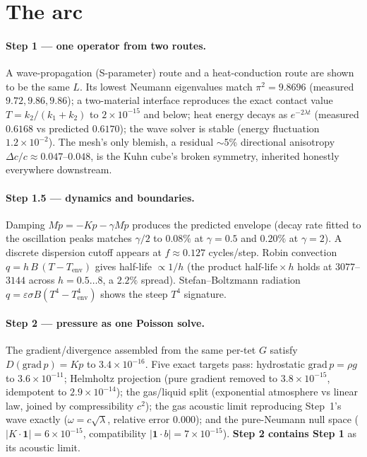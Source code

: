 \documentclass[11pt]{article}
\begin{document}
\section{The arc}

\paragraph{Step 1 --- one operator from two routes.}
A wave-propagation (S-parameter) route and a heat-conduction route are shown to be
the same $L$. Its lowest Neumann eigenvalues match $\pi^2 = 9.8696$ (measured
$9.72, 9.86, 9.86$); a two-material interface reproduces the exact contact value
$T = k_2/(k_1+k_2)$ to $2\times10^{-15}$ and below; heat energy decays as
$e^{-2\lambda t}$ (measured $0.6168$ vs predicted $0.6170$); the wave solver is
stable (energy fluctuation $1.2\times10^{-2}$). The mesh's only blemish, a residual
$\sim$5\% directional anisotropy $\Delta c/c \approx 0.047$--$0.048$, is the Kuhn
cube's broken symmetry, inherited honestly everywhere downstream.

\paragraph{Step 1.5 --- dynamics and boundaries.}
Damping $M\ddot p = -Kp - \gamma M\dot p$ produces the predicted envelope
(decay rate fitted to the oscillation peaks matches $\gamma/2$ to $0.08\%$ at
$\gamma{=}0.5$ and $0.20\%$ at $\gamma{=}2$). A discrete
dispersion cutoff appears at $f \approx 0.127$ cycles/step. Robin convection
$q = h\,B\,(T-T_{\text{env}})$ gives half-life $\propto 1/h$ (the product
$\text{half-life}\times h$ holds at $3077$--$3144$ across $h = 0.5\ldots8$, a
$2.2\%$ spread). Stefan--Boltzmann radiation
$q = \varepsilon\sigma B (T^4 - T_{\text{env}}^4)$ shows the steep $T^4$ signature.

\paragraph{Step 2 --- pressure as one Poisson solve.}
The gradient/divergence assembled from the same per-tet $G$ satisfy
$D(\mathrm{grad}\,p) = K p$ to $3.4\times10^{-16}$. Five exact targets pass:
hydrostatic $\mathrm{grad}\,p = \rho g$ to $3.6\times10^{-11}$; Helmholtz
projection (pure gradient removed to $3.8\times10^{-15}$, idempotent to
$2.9\times10^{-14}$); the gas/liquid split (exponential atmosphere vs linear law,
joined by compressibility $c^2$); the gas acoustic limit reproducing Step~1's wave
exactly ($\omega = c\sqrt{\lambda}$, relative error $0.000$); and the pure-Neumann
null space ($\lvert K\cdot\mathbf 1\rvert = 6\times10^{-15}$, compatibility
$\lvert \mathbf 1\cdot b\rvert = 7\times10^{-15}$). \textbf{Step 2 contains Step 1}
as its acoustic limit.
\end{document}
